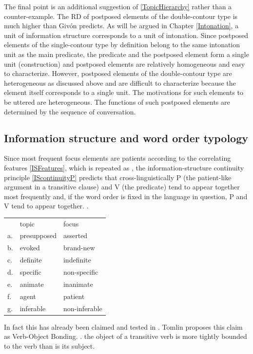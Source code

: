 The final point is an additional suggestion of \ref{TopicHierarchy} rather than a counter-example.
The RD of postposed elements of the double-contour type is much higher than Giv\'on predicts.
As will be argued in Chapter \ref{Intonation},
a unit of information structure corresponds to a unit of intonation.
Since postposed elements of the single-contour type by definition belong to the same intonation unit as the main predicate,
the predicate and the postposed element form a single unit (construction) and postposed elements are relatively homogeneous and easy to characterize.
However,
postposed elements of the double-contour type are heterogeneous as discussed above and are difficult to characterize
because the element itself corresponds to a single unit.
The motivations for such elements to be uttered are heterogeneous.
The functions of such postposed elements are determined by the sequence of conversation.


\subsection{Information structure and word order typology}\label{WO:Dis:WOTypology}

Since most frequent focus elements are patients according to the correlating features \ref{ISFeatures},
which is repeated as \Next,
the information-structure continuity principle \ref{IScontinuityP} predicts that cross-linguistically
P (the patient-like argument in a transitive clause) and V (the predicate) tend to appear together most frequently and,
if the word order is fixed in the language in question,
P and V tend to appear together.
%
\ex.
\begin{tabular}{lll}
	 & topic & focus \\
	a. & presupposed & asserted \\
	b. & evoked & brand-new \\
	c. & definite & indefinite \\
	d. & specific & non-specific \\
	e. & animate & inanimate \\
	f. & agent & patient \\
	g. & inferable & non-inferable \\
\end{tabular}
%

In fact this has already been claimed and tested in .
Tomlin proposes this claim as Verb-Object Bonding.
%
\ex. 
	the object of a transitive verb is more tightly bounded to the verb
	than is its subject.
	\hfill{\cite[][74]{tomlin86}}

